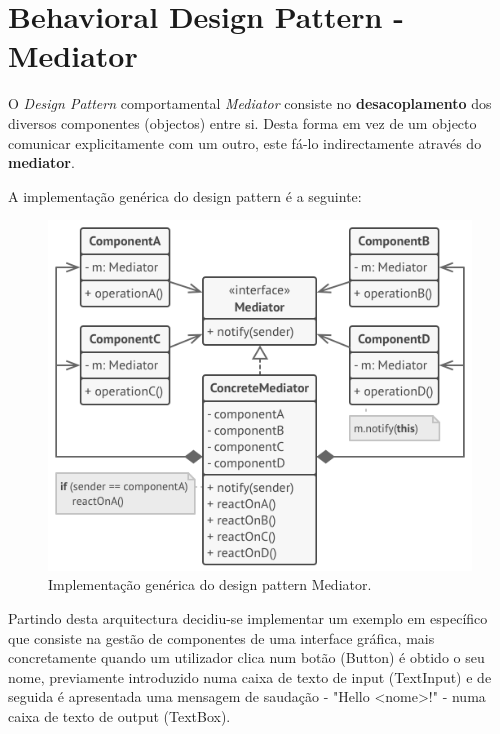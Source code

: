\section{Behavioral Design Pattern - Mediator}
\label{sec:mediator}

\hspace{3mm} O \textit{Design Pattern} comportamental \textit{Mediator} consiste no \textbf{desacoplamento} dos diversos componentes (objectos) entre si. Desta forma em vez de um objecto comunicar explicitamente com um outro, este fá-lo indirectamente através do \textbf{mediator}.

A implementação genérica do design pattern é a seguinte:

\begin{figure}[H]
    \centering
    \includegraphics[scale=0.48]{images/mediator_generic_architecture.png}
    \caption{Implementação genérica do design pattern Mediator.}
    \label{fig:mediator}
\end{figure}

Partindo desta arquitectura decidiu-se implementar um exemplo em específico que consiste na gestão de componentes de uma interface gráfica, mais concretamente quando um utilizador clica num botão (Button) é obtido o seu nome, previamente introduzido numa caixa de texto de input (TextInput) e de seguida é apresentada uma mensagem de saudação - "Hello <nome>!" - numa caixa de texto de output (TextBox).

